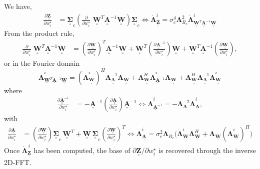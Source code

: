 \documentclass[12pt]{article}
\newcommand{\mybcirc}[1] {\underline{\underline{\bm{#1}}}}
\begin{document}
We have, 
\begin{equation} \label{eq:der_Z}
\begin{split}
    \frac{\partial \mybcirc{Z}}{\partial w_i^{\star}} 
    &= \mybcirc{\Sigma}_c 
    \left( \frac{\partial}{\partial w_i^{\star}} \; \mybcirc{W}^T \mybcirc{A}^{-1}\mybcirc{W} \right) 
    \mybcirc{\Sigma}_c
    \iff
    \dot{\bm{\Lambda}}_{\mybcirc{Z}}^{i} = \sigma_c^4 \bm{\Lambda}_{R_{c}}^2 \dot{\bm{\Lambda}}_{\mybcirc{W}^{T}\mybcirc{A}^{-1}\mybcirc{W}}^{i}
\end{split}
\end{equation}
From the product rule,
\begin{equation}
\begin{split}
    \frac{\partial}{\partial w_i^{\star}} \; \mybcirc{W}^T \mybcirc{A}^{-1}\mybcirc{W}
    &= \left(\frac{\partial \mybcirc{W}}{\partial w_i^{\star}}\right)^{\!T} 
    \mybcirc{A}^{-1}\mybcirc{W}
    + \mybcirc{W}^T 
    \left(\frac{\partial \mybcirc{A}^{-1}}{\partial w_i^\star}\right)
    \mybcirc{W}
    + \mybcirc{W}^T \mybcirc{A}^{-1} 
    \left(\frac{\partial \mybcirc{W}}{\partial w_i^\star}\right),
\end{split}
\end{equation}
or in the Fourier domain
\begin{equation}
    \dot{\bm{\Lambda}}_{\mybcirc{W}^{T}\mybcirc{A}^{-1}\mybcirc{W}}^{i} 
    = (\dot{\bm{\Lambda}}_{\mybcirc{W}}^{i})^{H} \bm{\Lambda}_{\mybcirc{A}}^{-1} \bm{\Lambda}_{\mybcirc{W}} + \bm{\Lambda}_{\mybcirc{W}}^H \dot{\bm{\Lambda}}_{\mybcirc{A}^{-1}}^{i} \bm{\Lambda}_{\mybcirc{W}} +
    \bm{\Lambda}_{\mybcirc{W}}^H \bm{\Lambda}_{\mybcirc{A}}^{-1}
    \dot{\bm{\Lambda}}_{\mybcirc{W}}^{i}
\end{equation}
where
\begin{equation} \label{eq:derivative_inv_A}
\begin{split}
    \frac{\partial \mybcirc{A}^{-1}}{\partial w_i^{\star}} 
    &= -\mybcirc{A}^{-1} 
    \left(\frac{\partial \mybcirc{A}}{\partial w_i^{\star}}\right) 
    \mybcirc{A}^{-1}
    \iff
    \dot{\bm{\Lambda}}_{\mybcirc{A}^{-1}}^{i} = -\bm{\Lambda}_{\mybcirc{A}}^{-2} \dot{\bm{\Lambda}}_{\mybcirc{A}}^{i},
\end{split}
\end{equation}
with
\begin{equation} \label{eq:derivative_A}
\begin{split}
    \frac{\partial \mybcirc{A}}{\partial w_i^{\star}} 
    &= \left(\frac{\partial \mybcirc{W}}{\partial w_i^{\star}}\right) \mybcirc{\Sigma}_{c} \, \mybcirc{W}^T 
    + \mybcirc{W} \, \mybcirc{\Sigma}_{c} \left(\frac{\partial \mybcirc{W}}{\partial w_i^{\star}}\right)^{\!T} 
    \iff
    \dot{\bm{\Lambda}}_{\mybcirc{A}}^{i} = \sigma_c^2 \bm{\Lambda}_{R_{c}} \bigl( \dot{\bm{\Lambda}}^{i}_{\mybcirc{W}}  \bm{\Lambda}_{\mybcirc{W}}^H + 
    \bm{\Lambda}_{\mybcirc{W}}
    (\dot{\bm{\Lambda}}_{\mybcirc{W}}^{i})^{H} \bigr)
\end{split}
\end{equation}
Once
$\dot{\bm{\Lambda}}_{\mybcirc{Z}}^{\,i}$
has been computed, the base of
$\partial \mybcirc{Z}/\partial w_i^\star$
is recovered through the inverse 2D-FFT.
\end{document}
